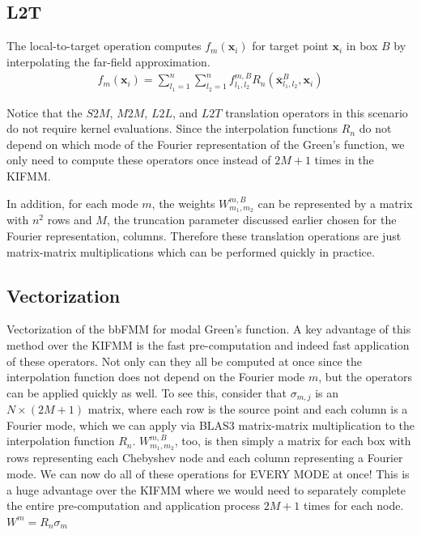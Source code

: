 \documentclass[11pt, oneside]{article}   	%
\begin{document}
\subsection{L2T}
The local-to-target operation computes $f_m(\mathbf{x}_i)$ for target point $\mathbf{x}_i$ in box $B$ by interpolating the far-field approximation.
\begin{align}
f_m(\mathbf{x}_i)=\sum_{l_1=1}^n \sum_{l_2=1}^n f^{m,B}_{l_1,l_2} R_n(\mathbf{\overline{x}}_{l_1,l_2}^B,\mathbf{x}_i)
\end{align}

Notice that the $S2M$, $M2M$, $L2L$, and $L2T$ translation operators in this scenario do not require kernel evaluations. Since the interpolation functions $R_n$ do not depend on which mode of the Fourier representation of the Green's function, we only need to compute these operators once instead of $2M+1$ times in the KIFMM.

In addition, for each mode $m$, the weights $W^{m,B}_{m_1,m_2}$ can be represented by a matrix with $n^2$ rows and $M$, the truncation parameter discussed earlier chosen for the Fourier representation, columns. Therefore these translation operations are just matrix-matrix multiplications which can be performed quickly in practice.

\subsection{Vectorization}
Vectorization of the bbFMM for modal Green's function. A key advantage of this method over the KIFMM is the fast pre-computation and indeed fast application of these operators. Not only can they all be computed at once since the interpolation function does not depend on the Fourier mode $m$, but the operators can be applied quickly as well. To see this, consider that $\sigma_{m,j}$ is an $N\times (2M+1)$ matrix, where each row is the source point and each column is a Fourier mode, which we can apply via BLAS3 matrix-matrix multiplication to the interpolation function $R_n$. $W_{m_1,m_2}^{m,B}$, too, is then simply a matrix for each box with rows representing each Chebyshev node and each column representing a Fourier mode. We can now do all of these operations for EVERY MODE at once! This is a huge advantage over the KIFMM where we would need to separately complete the entire pre-computation and application process $2M+1$ times for each node.
\\

$W^m=R_n \sigma_m$\\
\end{document}
